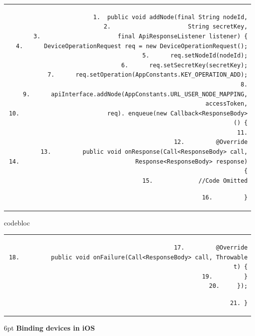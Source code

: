 \documentclass[a4paper,12pt,openany]{book}
\renewcommand{\ttfamily}{\fontfamily{pcr}\selectfont}
\renewcommand{\arraystretch}{1}
\newenvironment{codebloc}{ %
    \ttfamily\footnotesize
    \renewcommand{\arraystretch}{1}
}
\newcommand{\note}[2][NOTE]{ %
\vspace{6pt}
\begin{tabular}{b{\textwidth}}
\hline
\fontfamily{phv}\selectfont \textbf{#1}\\
\leftskip 1em #2\\
\hline
\end{tabular}
}
\begin{document}
\begin{codebloc}
\begin{tabular}{d}
\vspace{2pt}
\begin{verbatim}
1.  public void addNode(final String nodeId,
2.                      String secretKey,
3.                      final ApiResponseListener listener) {
4.      DeviceOperationRequest req = new DeviceOperationRequest();
5.      req.setNodeId(nodeId);
6.      req.setSecretKey(secretKey);
7.      req.setOperation(AppConstants.KEY_OPERATION_ADD);
8.
9.      apiInterface.addNode(AppConstants.URL_USER_NODE_MAPPING, accessToken,
10.                         req). enqueue(new Callback<ResponseBody>() {
11.
12.         @Override
13.         public void onResponse(Call<ResponseBody> call,
14.                                 Response<ResponseBody> response) {
15.             //Code Omitted
\end{verbatim}
\verb|16.         }|
\end{tabular}
\end{codebloc}

\begin{codebloc}
\begin{tabular}{d}
\vspace{2pt}
\begin{verbatim}
17.         @Override
18.         public void onFailure(Call<ResponseBody> call, Throwable t) {
19.         }
20.     });
\end{verbatim}
\verb|21. }|
\end{tabular}
\end{codebloc}

\vspace{6pt}
\textbf{Binding devices in iOS}

\end{document}
